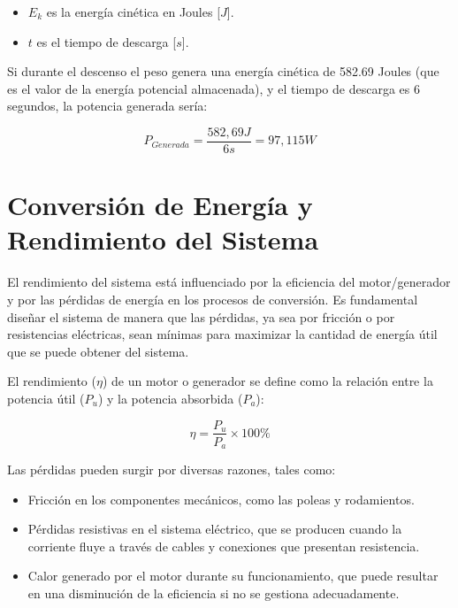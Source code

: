             \begin{itemize} [label=•]
                \setlength{\itemindent}{1.5em}
                
                \item $E_k$ es la energía cinética en Joules [$J$].
                \item $t$ es el tiempo de descarga [$s$].
            \end{itemize}

            Si durante el descenso el peso genera una energía cinética de 582.69 Joules (que es el valor de la energía potencial almacenada), y el tiempo de descarga es 6 segundos, la potencia generada sería:\par

            \begin{equation}
                P_{Generada} = \frac{582,69 J}{6 s} = 97,115 W
            \end{equation}
            
        \section{Conversión de Energía y Rendimiento del Sistema}
    
        El rendimiento del sistema está influenciado por la eficiencia del motor/generador y por las pérdidas de energía en los procesos de conversión. Es fundamental diseñar el sistema de manera que las pérdidas, ya sea por fricción o por resistencias eléctricas, sean mínimas para maximizar la cantidad de energía útil que se puede obtener del sistema.\par
        El rendimiento ($\eta$) de un motor o generador se define como la relación entre la potencia útil ($P_u$) y la potencia absorbida ($P_a$):\par

        \begin{equation}
            \eta = \frac{P_u}{P_a} \times 100\%
        \end{equation}
        
        Las pérdidas pueden surgir por diversas razones, tales como:\par

        \begin{itemize} [label=•]
            \setlength{\itemindent}{1.5em}
            
            \item Fricción en los componentes mecánicos, como las poleas y rodamientos.
            \item Pérdidas resistivas en el sistema eléctrico, que se producen cuando la corriente fluye a través de cables y conexiones que presentan resistencia.
            \item Calor generado por el motor durante su funcionamiento, que puede resultar en una disminución de la eficiencia si no se gestiona adecuadamente.
        \end{itemize}
        
